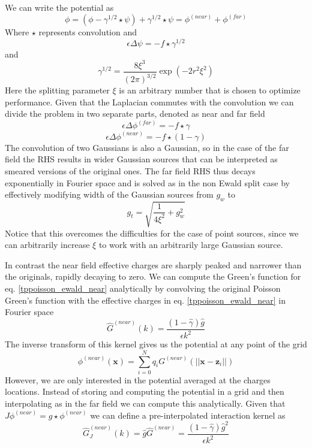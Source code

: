 \documentclass[ twoside,openright,titlepage,numbers=noenddot,%
headinclude,footinclude,cleardoublepage=empty,abstract=on,
BCOR=5mm,paper=a4,fontsize=11pt
]{scrreprt}
\renewcommand{\vec}[1]{\bm{#1}}
\begin{document}
We can write the potential as  
\begin{equation}
 \phi=(\phi - \gamma^{1/2}\star\psi) + \gamma^{1/2}\star\psi = \phi^{(near)} + \phi^{(far)}
\end{equation}  
Where  $\star$ represents convolution and
 \begin{equation}
 \epsilon\Delta\psi=-f\star\gamma^{1/2}
\end{equation}   
and  
 \begin{equation}
 \gamma^{1/2} = \frac{8\xi^3}{(2\pi)^{3/2}}\exp\left(-2r^2\xi^2\right)
\end{equation}   
Here the splitting parameter $\xi$ is an arbitrary number that is chosen to optimize performance. 
Given that the Laplacian commutes with the convolution we can divide the problem in two separate parts, denoted as near and far field  
 \begin{equation}
 \epsilon\Delta\phi^{(far)}=-f\star\gamma
\end{equation}   
\begin{equation}
 \label{tppoisson_ewald_near}
 \epsilon\Delta\phi^{(near)}=-f\star(1-\gamma)
\end{equation}   
The convolution of two Gaussians is also a Gaussian, so in the case of the far field the RHS results in wider Gaussian sources that can be interpreted as smeared versions of the original ones. The far field RHS thus decays exponentially in Fourier space and is solved as in the non Ewald split case by effectively modifying width of the Gaussian sources from $g_w$ to
\begin{equation}
  g_t = \sqrt{\frac{1}{4\xi^2} + g_w^2}
\end{equation}
Notice that this overcomes the difficulties for the case of point sources, since we can arbitrarily increase $\xi$ to work with an arbitrarily large Gaussian source.

In contrast the near field effective charges are sharply peaked and narrower than the originals, rapidly decaying to zero. We can compute the Green's function for eq. \eqref{tppoisson_ewald_near} analytically by convolving the original Poisson Green's function with the effective charges in eq. \eqref{tppoisson_ewald_near} in Fourier space
\begin{equation}
  \hat{G}^{(near)}(k) = \frac{(1-\hat{\gamma})\hat{g}}{\epsilon k^2}
\end{equation}
The inverse transform of this kernel gives us the potential at any point of the grid 
\begin{equation}
  \phi^{(near)}(\vec{x}) = \sum_{i=0}^N{q_iG^{(near)}(||\vec{x}-\vec{z}_i||)}
\end{equation}
However, we are only interested in the potential averaged at the charges locations. Instead of storing and computing the potential in a grid and then interpolating as in the far field we can compute this analytically. Given that $J \phi^{(near)} = g\star \phi^{(near)}$ we can define a pre-interpolated interaction kernel as
\begin{equation}
  \hat{G}_J^{(near)}(k) = \hat{g}\hat{G}^{(near)} = \frac{(1-\hat{\gamma})\hat{g}^2}{\epsilon k^2}
\end{equation}
\end{document}
